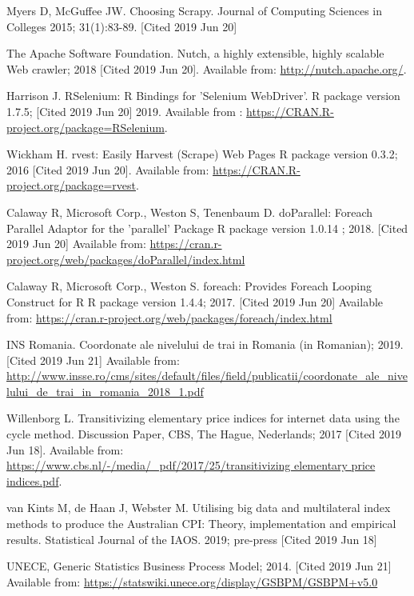\documentclass[]{article}
\begin{document}
\begin{thebibliography}{99}
Myers D, McGuffee JW. Choosing Scrapy. Journal of Computing Sciences in Colleges 2015; 31(1):83-89. [Cited 2019 Jun 20]

The Apache Software Foundation. Nutch, a highly extensible, highly scalable Web crawler; 2018 [Cited 2019 Jun 20]. Available from:
\url{http://nutch.apache.org/}.

Harrison J. RSelenium: R Bindings for 'Selenium WebDriver'. R package version 1.7.5; [Cited 2019 Jun 20] 2019. Available from :
\url{https://CRAN.R-project.org/package=RSelenium}.

Wickham H. rvest: Easily Harvest (Scrape) Web Pages {R package version 0.3.2}; 2016 [Cited 2019 Jun 20]. Available from:
\url{https://CRAN.R-project.org/package=rvest}.

Calaway R, Microsoft Corp., Weston S, Tenenbaum D. doParallel: Foreach Parallel Adaptor for the 'parallel' Package {R package version 1.0.14} ; 2018. [Cited 2019 Jun 20] Available from: \url{https://cran.r-project.org/web/packages/doParallel/index.html}

Calaway R, Microsoft Corp., Weston S. foreach: Provides Foreach Looping Construct for R {R package version 1.4.4}; 2017. [Cited 2019 Jun 20]
Available from: \url{https://cran.r-project.org/web/packages/foreach/index.html} 

INS Romania. Coordonate ale nivelului de trai in Romania (in Romanian); 2019. [Cited 2019 Jun 21] Available from:
\url{http://www.insse.ro/cms/sites/default/files/field/publicatii/coordonate_ale_nivelului_de_trai_in_romania_2018_1.pdf}

Willenborg L. Transitivizing elementary price indices for internet data using the cycle method. Discussion Paper, CBS, The Hague, Nederlands; 2017 [Cited 2019 Jun 18]. 
Available from: \url{https://www.cbs.nl/-/media/_pdf/2017/25/transitivizing elementary price indices.pdf}.

van Kints M, de Haan J, Webster M. Utilising big data and multilateral index methods to produce the Australian CPI: Theory, implementation and empirical results. Statistical Journal of the IAOS. 2019; pre-press [Cited 2019 Jun 18]

UNECE, Generic Statistics Business Process Model; 2014. [Cited 2019 Jun 21] Available from:
\url{https://statswiki.unece.org/display/GSBPM/GSBPM+v5.0}

\end{thebibliography}
\end{document}
